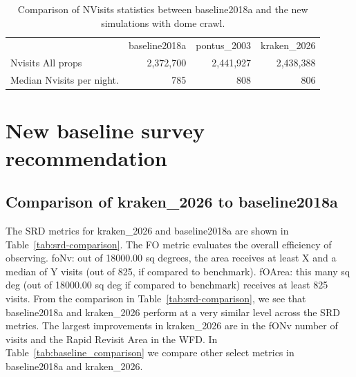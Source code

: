 \documentclass[DM,authoryear,toc]{lsstdoc}
\begin{document}
\begin{table}[htp]
\caption{Comparison of NVisits statistics between baseline2018a and the new simulations with dome crawl.}
\begin{center}
\small
\vskip 0.2in
\begin{tabular}{lrrr}
\toprule
{}                                        &   baseline2018a  &   pontus\_2003     &  kraken\_2026   \\
Nvisits All props                 &     2,372,700       &     2,441,927         &    2,438,388       \\
Median Nvisits per night.   &         785             &         808               &      806               \\
\bottomrule
\end{tabular}
\end{center}
\label{tab:nvisits-comparison}
\end{table}

 \section{New baseline survey recommendation}
 \subsection{Comparison of kraken\_2026 to baseline2018a}

The SRD metrics for kraken\_2026 and baseline2018a are shown in Table~\ref{tab:srd-comparison}.
The FO metric evaluates the overall efficiency of observing. foNv: out of 18000.00 sq degrees, the area receives at least X and
a median of Y visits (out of 825, if compared to benchmark). fOArea: this many sq deg (out of 18000.00 sq deg if compared to benchmark)
receives at least 825 visits. From the comparison in Table~\ref{tab:srd-comparison}, we see that baseline2018a and kraken\_2026 perform
at a very similar level across the SRD metrics. The largest improvements in kraken\_2026 are in the fONv number of visits and
the Rapid Revisit Area in the WFD. In Table~\ref{tab:baseline_comparison} we compare other select metrics in baseline2018a
and kraken\_2026.
\end{document}
